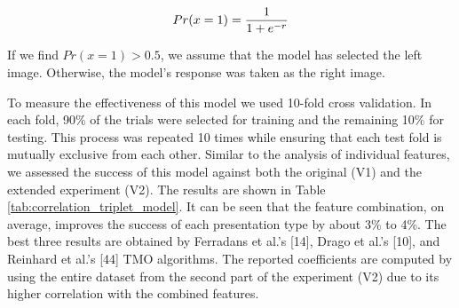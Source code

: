\begin{equation}
\label{eq:response_prob}
    Pr(x = 1) = {{1} \over {1 + e^{-r}}}
\end{equation}

If we find $Pr(x = 1) > 0.5$, we assume that the model has selected the left image. Otherwise, the model’s response was taken as the right image.

To measure the effectiveness of this model we used 10-fold cross validation. In each fold, 90\% of the trials
were selected for training and the remaining 10\% for testing. This process was repeated 10 times while ensuring that each test fold is mutually exclusive from each other. Similar to the analysis of individual features, we assessed the success of this model against both the original (V1) and the extended experiment (V2). The results are shown in Table \ref{tab:correlation_triplet_model}. It can be seen that the feature combination, on average, improves the success of each presentation type by about 3\% to 4\%. The best three results are obtained by Ferradans et al.’s [14], Drago et al.’s [10], and Reinhard et al.’s [44] TMO algorithms. The reported coefficients are computed by using the entire dataset from the second part of the experiment (V2) due to its higher correlation with the combined features.


